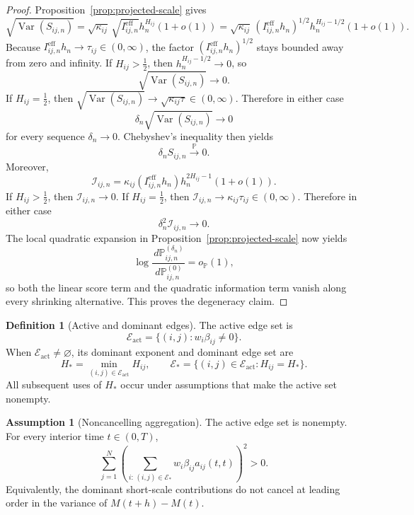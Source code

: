 \documentclass[11pt,a4paper]{amsart}
\theoremstyle{plain}
\theoremstyle{definition}
\newtheorem{definition}[theorem]{Definition}
\newtheorem{assumption}[theorem]{Assumption}
\theoremstyle{remark}
\DeclareMathOperator{\Var}{Var}
\newcommand{\PP}{\mathbb{P}}
\newcommand{\dd}{\,d}
\newcommand{\toP}{\xrightarrow{\PP}}
\newcommand{\cE}{\mathcal{E}}
\begin{document}
\begin{proof}
Proposition~\ref{prop:projected-scale} gives
\[
        \sqrt{\Var(S_{ij,n})}
        =
        \sqrt{\kappa_{ij}}\,\sqrt{I_{ij,n}^{\mathrm{eff}}}h_n^{H_{ij}}(1+o(1))
        =
        \sqrt{\kappa_{ij}}\,(I_{ij,n}^{\mathrm{eff}} h_n)^{1/2}h_n^{H_{ij}-1/2}(1+o(1)).
\]
Because \(I_{ij,n}^{\mathrm{eff}} h_n\to\tau_{ij}\in(0,\infty)\), the factor
\((I_{ij,n}^{\mathrm{eff}} h_n)^{1/2}\) stays bounded away from
zero and infinity.  If \(H_{ij}>\tfrac12\), then \(h_n^{H_{ij}-1/2}\to0\), so
\[
        \sqrt{\Var(S_{ij,n})}\to0.
\]
If \(H_{ij}=\tfrac12\), then \(\sqrt{\Var(S_{ij,n})}\to \sqrt{\kappa_{ij}\tau}\in(0,\infty)\).
Therefore in either case
\[
        \delta_n\sqrt{\Var(S_{ij,n})}\to0
\]
for every sequence \(\delta_n\to0\).  Chebyshev's inequality then yields
\[
        \delta_n S_{ij,n}\toP0.
\]
Moreover,
\[
        \mathcal I_{ij,n}
        =
        \kappa_{ij}(I_{ij,n}^{\mathrm{eff}} h_n)h_n^{2H_{ij}-1}(1+o(1)).
\]
If \(H_{ij}>\tfrac12\), then \(\mathcal I_{ij,n}\to0\).  If \(H_{ij}=\tfrac12\), then
\(\mathcal I_{ij,n}\to\kappa_{ij}\tau_{ij}\in(0,\infty)\).  Therefore in either case
\[
        \delta_n^2 \mathcal I_{ij,n}\to0.
\]
The local quadratic expansion in Proposition~\ref{prop:projected-scale} now yields
\[
        \log\frac{\dd \PP_{ij,n}^{(\delta_n)}}{\dd \PP_{ij,n}^{(0)}}
        =
        o_{\PP}(1),
\]
so both the linear score term and the quadratic information term vanish along every shrinking
alternative.  This proves the degeneracy claim.
\end{proof}

\begin{definition}[Active and dominant edges]
The active edge set is
\[
        \cE_{\mathrm{act}}
        =
        \{(i,j): w_i\beta_{ij}\neq0\}.
\]
When \(\cE_{\mathrm{act}}\neq\varnothing\), its dominant exponent and dominant edge set are
\[
        H_*
        =
        \min_{(i,j)\in \cE_{\mathrm{act}}} H_{ij},
        \qquad
        \cE_*
        =
        \{(i,j)\in \cE_{\mathrm{act}}: H_{ij}=H_*\}.
\]
All subsequent uses of \(H_*\) occur under assumptions that make the active set nonempty.
\end{definition}

\begin{assumption}[Noncancelling aggregation]\label{ass:noncancel}
The active edge set is nonempty.  For every interior time \(t\in(0,T)\),
\[
        \sum_{j=1}^N
        \left(
        \sum_{i:\,(i,j)\in\cE_*}
        w_i\beta_{ij}a_{ij}(t,t)
        \right)^2
        >0.
\]
Equivalently, the dominant short-scale contributions do not cancel at leading order in the
variance of \(M(t+h)-M(t)\).
\end{assumption}
\end{document}
